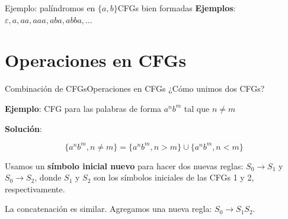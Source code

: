 \documentclass[spanish]{beamer}
\begin{document}
\begin{frame}{Ejemplo: palíndromos en $\{a,b\}$}{CFGs bien formadas}
    \textbf{Ejemplos}: $\varepsilon, a, aa, aaa, aba, abba, \dots$ \pause

    \bigskip






\end{frame}

\section{Operaciones en CFGs}

\begin{frame}{Combinación de CFGs}{Operaciones en CFGs}
    ¿Cómo \alert{unimos} dos CFGs? \pause

    \bigskip

    \textbf{Ejemplo}: CFG para las palabras de forma $a^nb^m$ tal que $n \neq m$ \pause

    \bigskip

    \textbf{Solución}:

    $$\{a^n b^m, n \neq m\} = \{a^n b^m, n > m\} \cup \{a ^n b ^m, n < m\}$$ \pause

    Usamos un \textbf{símbolo inicial nuevo} para hacer dos nuevas reglas: $S_0 \to S_1$ y $S_0 \to S_2$, donde $S_1$ y $S_2$ son los símbolos iniciales de las CFGs 1 y 2, respectivamente. \pause

    \bigskip

    La \alert{concatenación} es similar. Agregamos una nueva regla: $S_0 \to S_1S_2$.
\end{frame}
\end{document}
